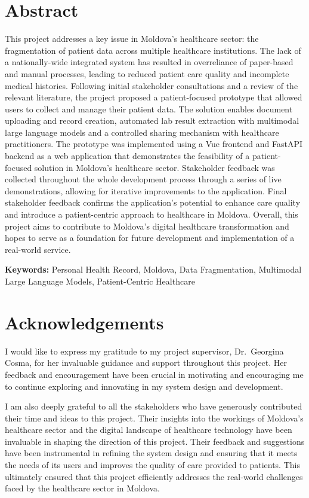 \chapter*{Abstract}
This project addresses a key issue in Moldova's healthcare sector: the fragmentation of patient data across multiple healthcare institutions. The lack of a nationally-wide integrated system has resulted in overreliance of paper-based and manual processes, leading to reduced patient care quality and incomplete medical histories. Following initial stakeholder consultations and a review of the relevant literature, the project proposed a patient-focused prototype  that allowed users to collect and manage their patient data. The solution enables document uploading and record creation, automated lab result extraction with multimodal large language models and a controlled sharing mechanism with healthcare practitioners. The prototype was implemented using a Vue frontend and FastAPI backend as a web application that demonstrates the feasibility of a patient-focused solution in Moldova's healthcare sector. Stakeholder feedback was collected throughout the whole development process through a series of live demonstrations, allowing for iterative improvements to the application. Final stakeholder feedback confirms the application's potential to enhance care quality and introduce a patient-centric approach to healthcare in Moldova. Overall, this project aims to contribute to Moldova's digital healthcare transformation and hopes to serve as a foundation for future development and implementation of a real-world service.

\textbf{Keywords:} Personal Health Record, Moldova, Data Fragmentation, Multimodal Large Language Models, Patient-Centric Healthcare

\chapter*{Acknowledgements}
I would like to express my gratitude to my project supervisor, Dr.\ Georgina Cosma, for her invaluable guidance and support throughout this project. Her feedback and encouragement have been crucial in motivating and encouraging me to continue exploring and innovating in my system design and development.

I am also deeply grateful to all the stakeholders who have generously contributed their time and ideas to this project. Their insights into the workings of Moldova's healthcare sector and the digital landscape of healthcare technology have been invaluable in shaping the direction of this project. Their feedback and suggestions have been instrumental in refining the system design and ensuring that it meets the needs of its users and improves the quality of care provided to patients. This ultimately ensured that this project efficiently addresses the real-world challenges faced by the healthcare sector in Moldova.

